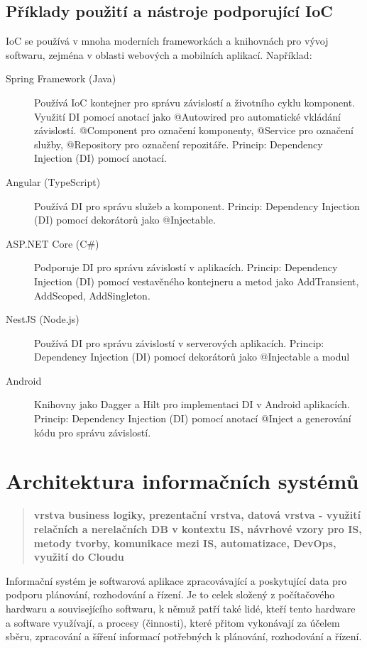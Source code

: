 \subsection{Příklady použití a nástroje podporující IoC}
IoC se používá v mnoha moderních frameworkách a knihovnách pro vývoj softwaru, 
zejména v oblasti webových a mobilních aplikací. Například:
\begin{description}
    \item[Spring Framework (Java)] Používá IoC kontejner pro správu závislostí a životního cyklu komponent.
    Využití DI pomocí anotací jako @Autowired pro automatické vkládání závislostí. @Component pro označení komponenty, 
    @Service pro označení služby, @Repository pro označení repozitáře.
    Princip: Dependency Injection (DI) pomocí anotací. 
     \item[Angular (TypeScript)] Používá DI pro správu služeb a komponent.
     Princip: Dependency Injection (DI) pomocí dekorátorů jako @Injectable.
     \item[ASP.NET Core (C\#)] Podporuje DI pro správu závislostí v aplikacích.
     Princip: Dependency Injection (DI) pomocí vestavěného kontejneru a metod jako AddTransient, AddScoped, AddSingleton.
     \item[NestJS (Node.js)] Používá DI pro správu závislostí v serverových aplikacích.
     Princip: Dependency Injection (DI) pomocí dekorátorů jako @Injectable a modul
     \item[Android] Knihovny jako Dagger a Hilt pro implementaci DI v Android aplikacích.
        Princip: Dependency Injection (DI) pomocí anotací @Inject a generování kódu pro správu závislostí.
\end{description}

\newpage

\section{Architektura informačních systémů}
\begin{quote}
\textbf{vrstva business logiky, prezentační vrstva, datová vrstva - využití relačních a nerelačních DB v kontextu IS, návrhové vzory pro IS, metody tvorby, komunikace mezi IS, automatizace, DevOps, využití do Cloudu}
\end{quote}
Informační systém je softwarová aplikace zpracovávající a poskytující 
data pro podporu plánování, rozhodování a řízení. Je to celek složený z 
počítačového hardwaru a souvisejícího softwaru, k němuž patří také lidé, 
kteří tento hardware a software využívají, a procesy (činnosti), které 
přitom vykonávají za účelem sběru, zpracování a šíření informací 
potřebných k plánování, rozhodování a řízení.

